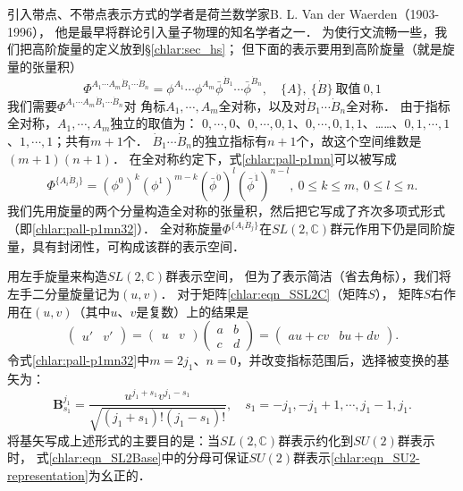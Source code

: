 引入带点、不带点表示方式的学者是荷兰数学家B. L. Van der Waerden（1903-1996），
他是最早将群论引入量子物理的知名学者之一．
为使行文流畅一些，我们把高阶旋量的定义放到\S\ref{chlar:sec_hs}；
但下面的表示要用到高阶旋量（就是旋量的张量积）
\begin{equation}\label{chlar:pall-p1mn}
    \Phi^{A_1 \cdots A_m \dot{B}_1 \cdots \dot{B}_n} = 
    \phi^{A_1} \cdots \phi^{A_m} \bar{\phi}^{\dot{B}_1} \cdots \bar{\phi}^{\dot{B}_n} , \quad 
    \{A\},\ \{\dot{B}\} \ \text{取值}\ 0, 1
\end{equation}
我们需要$\Phi^{A_1 \cdots A_m \dot{B}_1 \cdots \dot{B}_n}$对
{\kaishu 角标$A_1,\cdots,A_m$全对称，以及对$\dot{B}_1 \cdots \dot{B}_n$全对称}．
由于指标全对称，$A_1,\cdots,A_m$独立的取值为：
$0,\cdots,0$、$0,\cdots,0,1$、$0,\cdots,0,1,1$、……、$0,1,\cdots,1$、$1,\cdots,1$；共有$m+1$个．
$\dot{B}_1 \cdots \dot{B}_n$的独立指标有$n+1$个，故这个空间维数是$(m+1)(n+1)$．
在全对称约定下，式\eqref{chlar:pall-p1mn}可以被写成
\begin{equation}\label{chlar:pall-p1mn32}
    \Phi^{\{A_i \dot{B}_j\}} = \left( \phi^{0}\right)^k \left( \phi^{1}\right)^{m-k}  
    \left( \bar{\phi}^{\dot{0}}\right)^l \left( \bar{\phi}^{\dot{1}}\right)^{n-l} , 
    \ 0 \leqslant k \leqslant m,\  0 \leqslant l \leqslant n.
\end{equation}
我们先用旋量的两个分量构造全对称的张量积，然后把它写成了齐次多项式形式（即\eqref{chlar:pall-p1mn32}）．
全对称旋量$\Phi^{\{A_i \dot{B}_j\}}$在$SL(2,\mathbb{C})$群元作用下仍是同阶旋量，具有封闭性，可构成该群的表示空间．


用左手旋量来构造$SL(2,\mathbb{C})$群表示空间，
但为了表示简洁（省去角标），我们将左手二分量旋量记为$(u,v)$．
对于矩阵\eqref{chlar:eqn_SSL2C}（矩阵$S$），
矩阵$S$右作用在$(u,v)$（其中$u$、$v$是复数）上的结果是
\begin{equation}
    \begin{pmatrix} u'& v' \end{pmatrix} =
    \begin{pmatrix} u & v \end{pmatrix}
    \begin{pmatrix} a & b  \\ c & d \end{pmatrix}
    =\begin{pmatrix} au+cv & bu+dv \end{pmatrix}.
\end{equation}
令式\eqref{chlar:pall-p1mn32}中$m=2j_1$、$n=0$，并改变指标范围后，选择被变换的基矢为：
\begin{equation}\label{chlar:eqn_SL2Base}
    \boldsymbol{B}^{j_1}_{s_1} = \frac{u^{j_1+s_1} v^{j_1-s_1}}{\sqrt{(j_1+s_1)!(j_1-s_1)!}},\quad
    s_1 = -j_1, -j_1 +1, \cdots, j_1 -1, j_1 .
\end{equation}
将基矢写成上述形式的主要目的是：当$SL(2,\mathbb{C})$群表示约化到$SU(2)$群表示时，
式\eqref{chlar:eqn_SL2Base}中的分母可保证$SU(2)$群表示\eqref{chlar:eqn_SU2-representation}为幺正的．

